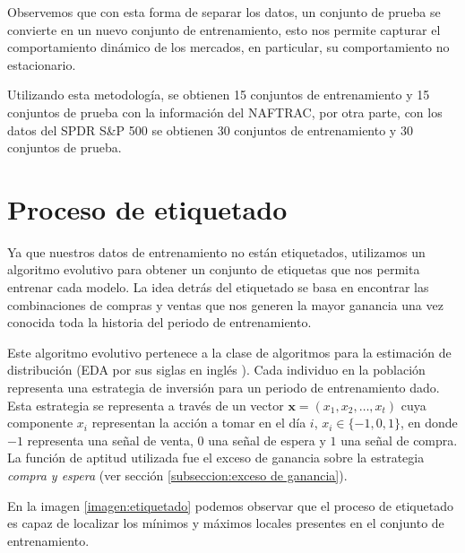 \documentclass[12pt]{report}
\theoremstyle{break}
\theoremstyle{break}
\begin{document}
Observemos que con esta forma de separar los datos, un conjunto de prueba se convierte en un nuevo conjunto de entrenamiento, esto nos permite capturar el comportamiento dinámico de los mercados, en particular, su comportamiento no estacionario.

Utilizando esta metodología, se obtienen 15 conjuntos de entrenamiento y 15 conjuntos de prueba con la información del NAFTRAC, por otra parte, con los datos del SPDR S\&P 500 se obtienen 30 conjuntos de entrenamiento y 30 conjuntos de prueba.


\section{Proceso de etiquetado}
\label{seccion:proceso etiquetado}
Ya que nuestros datos de entrenamiento no están etiquetados, utilizamos un algoritmo evolutivo para obtener un conjunto de etiquetas que nos permita entrenar cada modelo. La idea detrás del etiquetado se basa en encontrar las combinaciones de compras y ventas que nos generen la mayor ganancia una vez conocida toda la historia del periodo de entrenamiento.

Este algoritmo evolutivo pertenece a la clase de algoritmos para la estimación de distribución (EDA por sus siglas en inglés \cite{simon2013evolutionary}). Cada individuo en la población representa una estrategia de inversión para un periodo de entrenamiento dado. Esta estrategia se representa a través de un vector $\mathbf{x} = (x_1, x_2, \ldots, x_t)$ cuya componente $x_i$ representan la acción a tomar en el día $i$, $x_i \in \{-1,0,1\}$, en donde $-1$ representa una señal de venta, $0$ una señal de espera y $1$ una señal de compra. La función de aptitud utilizada fue el exceso de ganancia sobre la estrategia \textit{compra y espera} (ver sección \ref{subseccion:exceso de ganancia}).

En la imagen \ref{imagen:etiquetado} podemos observar que el proceso de etiquetado es capaz de localizar los mínimos y máximos locales presentes en el conjunto de entrenamiento.
\end{document}
